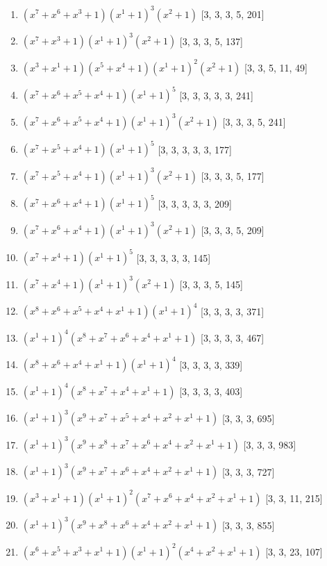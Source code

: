 \documentclass[10pt,twocolumn]{article}
\begin{document}
\begin{enumerate}
\item $(x^{7} + x^{6} + x^{3} + 1)(x^{1} + 1)^{3}(x^{2} + 1)$  [3, 3, 3, 5, 201]
\item $(x^{7} + x^{3} + 1)(x^{1} + 1)^{3}(x^{2} + 1)$  [3, 3, 3, 5, 137]
\item $(x^{3} + x^{1} + 1)(x^{5} + x^{4} + 1)(x^{1} + 1)^{2}(x^{2} + 1)$  [3, 3, 5, 11, 49]
\item $(x^{7} + x^{6} + x^{5} + x^{4} + 1)(x^{1} + 1)^{5}$  [3, 3, 3, 3, 3, 241]
\item $(x^{7} + x^{6} + x^{5} + x^{4} + 1)(x^{1} + 1)^{3}(x^{2} + 1)$  [3, 3, 3, 5, 241]
\item $(x^{7} + x^{5} + x^{4} + 1)(x^{1} + 1)^{5}$  [3, 3, 3, 3, 3, 177]
\item $(x^{7} + x^{5} + x^{4} + 1)(x^{1} + 1)^{3}(x^{2} + 1)$  [3, 3, 3, 5, 177]
\item $(x^{7} + x^{6} + x^{4} + 1)(x^{1} + 1)^{5}$  [3, 3, 3, 3, 3, 209]
\item $(x^{7} + x^{6} + x^{4} + 1)(x^{1} + 1)^{3}(x^{2} + 1)$  [3, 3, 3, 5, 209]
\item $(x^{7} + x^{4} + 1)(x^{1} + 1)^{5}$  [3, 3, 3, 3, 3, 145]
\item $(x^{7} + x^{4} + 1)(x^{1} + 1)^{3}(x^{2} + 1)$  [3, 3, 3, 5, 145]
\item $(x^{8} + x^{6} + x^{5} + x^{4} + x^{1} + 1)(x^{1} + 1)^{4}$  [3, 3, 3, 3, 371]
\item $(x^{1} + 1)^{4}(x^{8} + x^{7} + x^{6} + x^{4} + x^{1} + 1)$  [3, 3, 3, 3, 467]
\item $(x^{8} + x^{6} + x^{4} + x^{1} + 1)(x^{1} + 1)^{4}$  [3, 3, 3, 3, 339]
\item $(x^{1} + 1)^{4}(x^{8} + x^{7} + x^{4} + x^{1} + 1)$  [3, 3, 3, 3, 403]
\item $(x^{1} + 1)^{3}(x^{9} + x^{7} + x^{5} + x^{4} + x^{2} + x^{1} + 1)$  [3, 3, 3, 695]
\item $(x^{1} + 1)^{3}(x^{9} + x^{8} + x^{7} + x^{6} + x^{4} + x^{2} + x^{1} + 1)$  [3, 3, 3, 983]
\item $(x^{1} + 1)^{3}(x^{9} + x^{7} + x^{6} + x^{4} + x^{2} + x^{1} + 1)$  [3, 3, 3, 727]
\item $(x^{3} + x^{1} + 1)(x^{1} + 1)^{2}(x^{7} + x^{6} + x^{4} + x^{2} + x^{1} + 1)$  [3, 3, 11, 215]
\item $(x^{1} + 1)^{3}(x^{9} + x^{8} + x^{6} + x^{4} + x^{2} + x^{1} + 1)$  [3, 3, 3, 855]
\item $(x^{6} + x^{5} + x^{3} + x^{1} + 1)(x^{1} + 1)^{2}(x^{4} + x^{2} + x^{1} + 1)$  [3, 3, 23, 107]

\end{enumerate}
\end{document}

